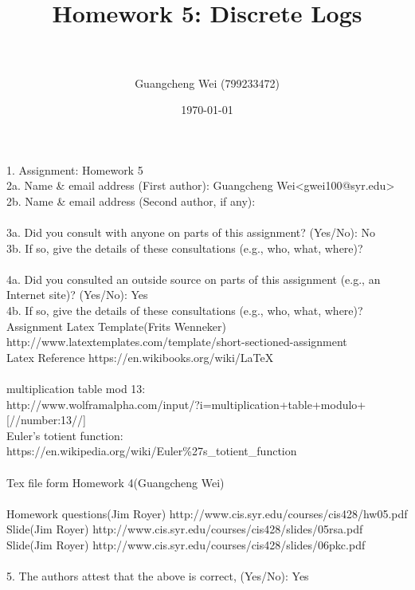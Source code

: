\documentclass[paper=a4, fontsize=11pt]{scrartcl} %
\title{ 
\horrule{0.5pt} \\[0.4cm] %
\huge Homework 5: Discrete Logs \\ %
\horrule{2pt} \\[0.5cm] %
}
\author{Guangcheng Wei (799233472)} %
\date{\normalsize\today} %
\numberwithin{equation}{section} %
\numberwithin{figure}{section} %
\begin{document}
\maketitle %

1.  Assignment: Homework 5\\

2a. Name \& email address (First author): Guangcheng Wei<gwei100@syr.edu> \\
2b. Name \& email address (Second author, if any):\\
\\
3a. Did you consult with anyone on parts of this assignment? (Yes/No): No\\
3b. If so, give the details of these consultations (e.g., who, what,    where)?\\
\\
4a. Did you consulted an outside source on parts of this assignment     (e.g., an Internet site)?  (Yes/No): Yes\\
4b. If so, give the details of these consultations (e.g., who, what,     where)?
\\
Assignment Latex Template(Frits Wenneker) http://www.latextemplates.com/template/short-sectioned-assignment\\
Latex Reference https://en.wikibooks.org/wiki/LaTeX\\
\\
multiplication table mod 13: \\http://www.wolframalpha.com/input/?i=multiplication+table+modulo+[//number:13//]\\
Euler's totient function: https://en.wikipedia.org/wiki/Euler\%27s\_totient\_function\\
\\
Tex file form Homework 4(Guangcheng Wei)\\
\\
Homework questions(Jim Royer) http://www.cis.syr.edu/courses/cis428/hw05.pdf\\
Slide(Jim Royer) http://www.cis.syr.edu/courses/cis428/slides/05rsa.pdf\\
Slide(Jim Royer) http://www.cis.syr.edu/courses/cis428/slides/06pkc.pdf\\
\\
5.  The authors attest that the above is correct, (Yes/No): Yes\\
\end{document}
